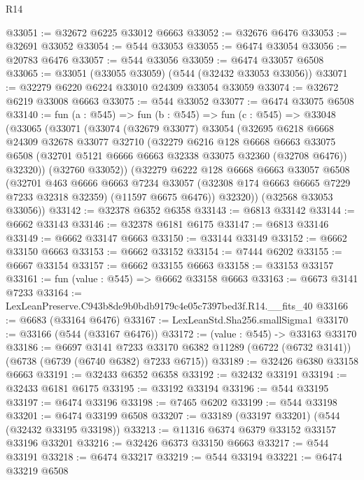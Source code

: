 \begin{lexlean}{R14}
\begin{coremodule}
@33051 := @32672 @6225 @33012 @6663
@33052 := @32676 @6476
@33053 := @32691 @33052
@33054 := @544 @33053
@33055 := @6474 @33054
@33056 := @20783 @6476
@33057 := @544 @33056
@33059 := @6474 @33057 @6508
@33065 := @33051 (@33055 @33059) (@544 (@32432 @33053 @33056))
@33071 := @32279 @6220 @6224 @33010 @24309 @33054 @33059
@33074 := @32672 @6219 @33008 @6663
@33075 := @544 @33052
@33077 := @6474 @33075 @6508
@33140 := fun (a : @545) =>
  fun (b : @545) =>
  fun (c : @545) =>
  @33048
    (@33065
      (@33071
        (@33074
          (@32679 @33077)
          @33054
          (@32695
            @6218
            @6668
            @24309
            @32678
            @33077
            @32710
            (@32279
              @6216
              @128
              @6668
              @6663
              @33075
              @6508
              (@32701 @5121 @6666 @6663 @32338 @33075 @32360 (@32708 @6476))
              @32320))
          (@32760 @33052))
        (@32279
          @6222
          @128
          @6668
          @6663
          @33057
          @6508
          (@32701
            @463
            @6666
            @6663
            @7234
            @33057
            (@32308 @174 @6663 @6665 @7229 @7233 @32318 @32359)
            (@11597 @6675 @6476))
          @32320))
      (@32568 @33053 @33056))
@33142 := @32378 @6352 @6358
@33143 := @6813 @33142
@33144 := @6662 @33143
@33146 := @32378 @6181 @6175
@33147 := @6813 @33146
@33149 := @6662 @33147 @6663
@33150 := @33144 @33149
@33152 := @6662 @33150 @6663
@33153 := @6662 @33152
@33154 := @7444 @6202
@33155 := @6667 @33154
@33157 := @6662 @33155 @6663
@33158 := @33153 @33157
@33161 := fun (value : @545) => @6662 @33158 @6663
@33163 := @6673 @3141 @7233
@33164 := LexLeanPreserve.C943b8de9b0bdb9179c4e05c7397bed3f.R14.__fits_40
@33166 := @6683 (@33164 @6476)
@33167 := LexLeanStd.Sha256.smallSigma1
@33170 := @33166 (@544 (@33167 @6476))
@33172 := (value : @545) -> @33163 @33170
@33186 := @6697
    @3141
    @7233
    @33170
    @6382
    @11289
    (@6722 (@6732 @3141))
    (@6738 (@6739 (@6740 @6382) @7233 @6715))
@33189 := @32426 @6380 @33158 @6663
@33191 := @32433 @6352 @6358
@33192 := @32432 @33191
@33194 := @32433 @6181 @6175
@33195 := @33192 @33194
@33196 := @544 @33195
@33197 := @6474 @33196
@33198 := @7465 @6202
@33199 := @544 @33198
@33201 := @6474 @33199 @6508
@33207 := @33189 (@33197 @33201) (@544 (@32432 @33195 @33198))
@33213 := @11316 @6374 @6379 @33152 @33157 @33196 @33201
@33216 := @32426 @6373 @33150 @6663
@33217 := @544 @33191
@33218 := @6474 @33217
@33219 := @544 @33194
@33221 := @6474 @33219 @6508

\end{coremodule}
\end{lexlean}
